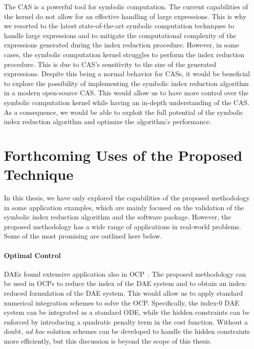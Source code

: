 The \Maple{} \ac{CAS} is a powerful tool for symbolic computation. The current capabilities of the \Maple{} kernel do not allow for an effective handling of large expressions. This is why we resorted to the latest state-of-the-art symbolic computation techniques to handle large expressions and to mitigate the computational complexity of the expressions generated during the index reduction procedure. However, in some cases, the \Maple{} symbolic computation kernel struggles to perform the index reduction procedure. This is due to \ac{CAS}'s sensitivity to the size of the generated expressions. Despite this being a normal behavior for \acp{CAS}, it would be beneficial to explore the possibility of implementing the symbolic index reduction algorithm in a modern open-source \ac{CAS}. This would allow us to have more control over the symbolic computation kernel while having an in-depth understanding of the \ac{CAS}. As a consequence, we would be able to exploit the full potential of the symbolic index reduction algorithm and optimize the algorithm's performance.

\section{Forthcoming Uses of the Proposed Technique}

In this thesis, we have only explored the capabilities of the proposed methodology in some application examples, which are mainly focused on the validation of the symbolic index reduction algorithm and the \Indigo{} software package. However, the proposed methodology has a wide range of applications in real-world problems. Some of the most promising are outlined here below.

\paragraph{Optimal Control}

\acp{DAE} found extensive application also in \ac{OCP}~\cite{gerdts2012optimal, gerdts2003optimal, gerdts2005gradient}. The proposed methodology can be used in \acp{OCP} to reduce the index of the \ac{DAE} system and to obtain an index-reduced formulation of the \ac{DAE} system. This would allow us to apply standard numerical integration schemes to solve the \ac{OCP}. Specifically, the index-0 \ac{DAE} system can be integrated as a standard \ac{ODE}, while the hidden constraints can be enforced by introducing a quadratic penalty term in the cost function. Without a doubt, \emph{ad hoc} solution schemes can be developed to handle the hidden constraints more efficiently, but this discussion is beyond the scope of this thesis.

